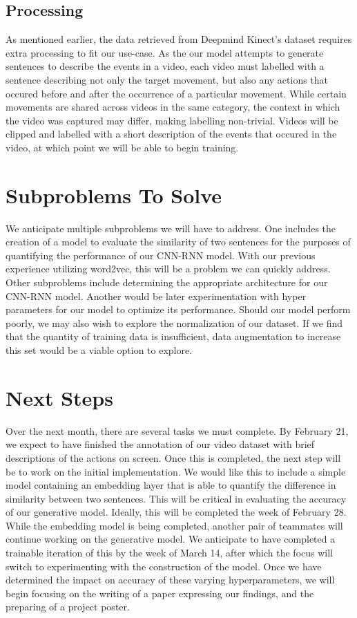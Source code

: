 \documentclass[11pt]{article}
\begin{document}
\subsection{Processing}
As mentioned earlier, the data retrieved from Deepmind Kinect's dataset requires extra processing to fit our use-case.
As the our model attempts to generate sentences to describe
the events in a video, each video must labelled with a sentence describing not only the target movement, but also
any actions that occured before and after the occurrence of a particular movement. While certain movements are shared
across videos in the same category, the context in which the video was captured may differ, making labelling non-trivial.
Videos will be clipped and labelled with a short description of the events that occured in the video, at which point we will be able
to begin training.

\section{Subproblems To Solve}
We anticipate multiple subproblems we will have to address. One includes the creation of a model to evaluate the similarity of two
sentences for the purposes of quantifying the performance of our CNN-RNN model. With our previous experience utilizing word2vec, this
will be a problem we can quickly address. Other subproblems include determining the appropriate architecture for our CNN-RNN model.
Another would be later experimentation with hyper parameters for our model to optimize its performance. Should our model perform poorly,
we may also wish to explore the normalization of our dataset. If we find that the quantity of training data is insufficient, data
augmentation to increase this set would be a viable option to explore.

\section{Next Steps}
Over the next month, there are several tasks we must complete. By February 21, we expect to have finished the annotation of our video
dataset with brief descriptions of the actions on screen. Once this is completed, the next step will be to work on the initial implementation.
We would like this to include a simple model containing an embedding layer that is able to quantify the difference in similarity between
two sentences. This will be critical in evaluating the accuracy of our generative model. Ideally, this will be completed the week of February 28.
While the embedding model is being completed, another pair of teammates will continue working on the generative model. We anticipate to have completed
a trainable iteration of this by the week of March 14, after which the focus will switch to experimenting with the construction of the model. Once we
have determined the impact on accuracy of these varying hyperparameters, we will begin focusing on the writing of a paper expressing our findings, and the
preparing of a project poster.
\end{document}
